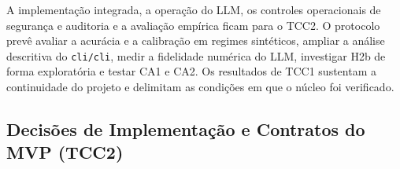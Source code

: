 \documentclass[12pt,openany,oneside,a4paper,english,brazilian,sumario=tradicional]{abntex2}
\begin{document}
A implementação integrada, a operação do LLM, os controles operacionais de segurança e auditoria e a avaliação empírica ficam para o TCC2. O protocolo prevê avaliar a acurácia e a calibração em regimes sintéticos, ampliar a análise descritiva do \texttt{cli/\allowbreak cli}, medir a fidelidade numérica do LLM, investigar H2b de forma exploratória e testar CA1 e CA2. Os resultados de TCC1 sustentam a continuidade do projeto e delimitam as condições em que o núcleo foi verificado.

\postextual



\begin{apendicesenv}
\partapendices

\chapter{Decisões de Implementação e Contratos do MVP (TCC2)}\label{apd:mvp}


\end{apendicesenv}
\end{document}
